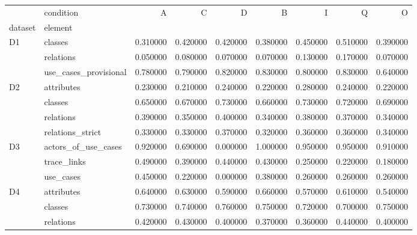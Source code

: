 \begin{tabular}{llrrrrrrr}
\toprule
 & condition & A & C & D & B & I & Q & O \\
dataset & element &  &  &  &  &  &  &  \\
\midrule
\multirow[t]{3}{*}{D1} & classes & 0.310000 & 0.420000 & 0.420000 & 0.380000 & 0.450000 & 0.510000 & 0.390000 \\
 & relations & 0.050000 & 0.080000 & 0.070000 & 0.070000 & 0.130000 & 0.170000 & 0.070000 \\
 & use_cases_provisional & 0.780000 & 0.790000 & 0.820000 & 0.830000 & 0.800000 & 0.830000 & 0.640000 \\
\cline{1-9}
\multirow[t]{4}{*}{D2} & attributes & 0.230000 & 0.210000 & 0.240000 & 0.220000 & 0.280000 & 0.240000 & 0.220000 \\
 & classes & 0.650000 & 0.670000 & 0.730000 & 0.660000 & 0.730000 & 0.720000 & 0.690000 \\
 & relations & 0.390000 & 0.350000 & 0.400000 & 0.340000 & 0.380000 & 0.370000 & 0.340000 \\
 & relations_strict & 0.330000 & 0.330000 & 0.370000 & 0.320000 & 0.360000 & 0.360000 & 0.340000 \\
\cline{1-9}
\multirow[t]{3}{*}{D3} & actors_of_use_cases & 0.920000 & 0.690000 & 0.000000 & 1.000000 & 0.950000 & 0.950000 & 0.910000 \\
 & trace_links & 0.490000 & 0.390000 & 0.440000 & 0.430000 & 0.250000 & 0.220000 & 0.180000 \\
 & use_cases & 0.450000 & 0.220000 & 0.000000 & 0.380000 & 0.260000 & 0.260000 & 0.260000 \\
\cline{1-9}
\multirow[t]{3}{*}{D4} & attributes & 0.640000 & 0.630000 & 0.590000 & 0.660000 & 0.570000 & 0.610000 & 0.540000 \\
 & classes & 0.730000 & 0.740000 & 0.760000 & 0.750000 & 0.720000 & 0.700000 & 0.750000 \\
 & relations & 0.420000 & 0.430000 & 0.400000 & 0.370000 & 0.360000 & 0.440000 & 0.400000 \\
\cline{1-9}
\bottomrule
\end{tabular}


